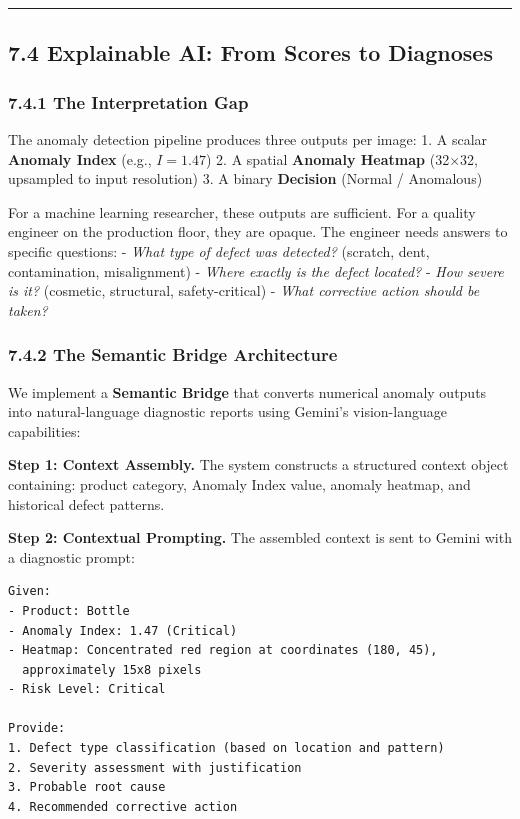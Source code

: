\begin{center}\rule{0.5\linewidth}{0.5pt}\end{center}

\subsection{7.4 Explainable AI: From Scores to Diagnoses}\label{explainable-ai-from-scores-to-diagnoses}

\subsubsection{7.4.1 The Interpretation Gap}\label{the-interpretation-gap}

The anomaly detection pipeline produces three outputs per image: 1. A scalar \textbf{Anomaly Index} (e.g., \(I = 1.47\)) 2. A spatial \textbf{Anomaly Heatmap} (32×32, upsampled to input resolution) 3. A binary \textbf{Decision} (Normal / Anomalous)

For a machine learning researcher, these outputs are sufficient. For a quality engineer on the production floor, they are opaque. The engineer needs answers to specific questions: - \emph{What type of defect was detected?} (scratch, dent, contamination, misalignment) - \emph{Where exactly is the defect located?} - \emph{How severe is it?} (cosmetic, structural, safety-critical) - \emph{What corrective action should be taken?}

\subsubsection{7.4.2 The Semantic Bridge Architecture}\label{the-semantic-bridge-architecture}

We implement a \textbf{Semantic Bridge} that converts numerical anomaly outputs into natural-language diagnostic reports using Gemini's vision-language capabilities:

\textbf{Step 1: Context Assembly.} The system constructs a structured context object containing: product category, Anomaly Index value, anomaly heatmap, and historical defect patterns.

\textbf{Step 2: Contextual Prompting.} The assembled context is sent to Gemini with a diagnostic prompt:

\begin{verbatim}
Given:
- Product: Bottle
- Anomaly Index: 1.47 (Critical)
- Heatmap: Concentrated red region at coordinates (180, 45),
  approximately 15x8 pixels
- Risk Level: Critical

Provide:
1. Defect type classification (based on location and pattern)
2. Severity assessment with justification
3. Probable root cause
4. Recommended corrective action
\end{verbatim}

